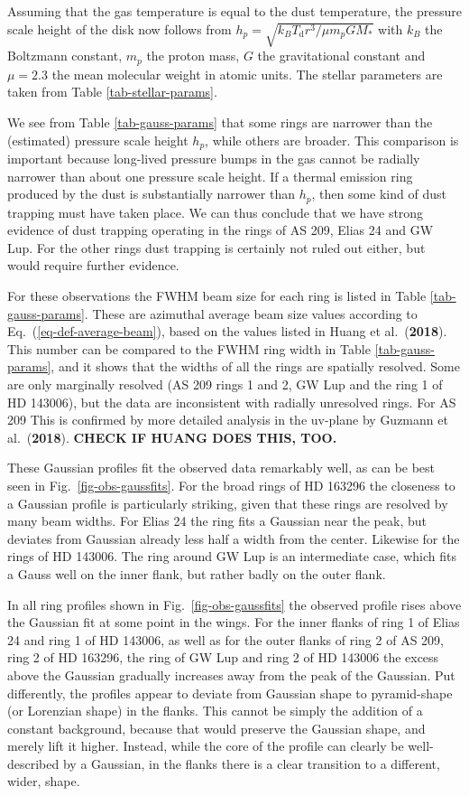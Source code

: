 \documentclass{aa}
\def\paperdsharphuangrings{Huang et al.\ ({\bf 2018})}
\def\paperdsharpguzmann{Guzmann et al.\ ({\bf 2018})}
\begin{document}
Assuming that the gas temperature is equal to the dust temperature, the
pressure scale height of the disk now
follows from $h_p=\sqrt{k_BT_{\mathrm{d}}r^3/\mu m_pGM_{*}}$ with $k_B$ the
Boltzmann constant, $m_p$ the proton mass, $G$ the gravitational constant and
$\mu=2.3$ the mean molecular weight in atomic units. The stellar parameters are
taken from Table \ref{tab-stellar-params}.

We see from Table \ref{tab-gauss-params} that some rings are narrower than the
(estimated) pressure scale height $h_p$, while others are broader. This
comparison is important because long-lived pressure bumps in the gas cannot be
radially narrower than about one pressure scale height. If a thermal emission
ring produced by the dust is substantially narrower than $h_p$, then some kind
of dust trapping must have taken place. We can thus conclude that we have strong
evidence of dust trapping operating in the rings of AS 209, Elias 24 and GW Lup.
For the other rings dust trapping is certainly not ruled out either, but would
require further evidence. 

For these observations the FWHM beam size for each ring is listed in Table
\ref{tab-gauss-params}. These are azimuthal average beam size values according
to Eq.~(\ref{eq-def-average-beam}), based on the values listed in
\paperdsharphuangrings{}. This number can be compared to the FWHM ring width in
Table \ref{tab-gauss-params}, and it shows that the widths of all the rings are
spatially resolved. Some are only marginally resolved (AS 209 rings 1 and 2, GW
Lup and the ring 1 of HD 143006), but the data are inconsistent with radially
unresolved rings. For AS 209 This is confirmed by more detailed analysis in the
uv-plane by \paperdsharpguzmann{}. {\bf CHECK IF HUANG DOES THIS, TOO.}

These Gaussian profiles fit the observed data remarkably well, as can be best
seen in Fig.~\ref{fig-obs-gaussfits}.  For the broad rings of HD 163296 the
closeness to a Gaussian profile is particularly striking, given that these rings
are resolved by many beam widths.  For Elias 24 the ring fits a Gaussian near
the peak, but deviates from Gaussian already less half a width from the
center. Likewise for the rings of HD 143006. The ring around GW Lup is an
intermediate case, which fits a Gauss well on the inner flank, but rather badly
on the outer flank.

In all ring profiles shown in Fig.~\ref{fig-obs-gaussfits} the observed profile
rises above the Gaussian fit at some point in the wings. For the inner flanks of
ring 1 of Elias 24 and ring 1 of HD 143006, as well as for the outer flanks of
ring 2 of AS 209, ring 2 of HD 163296, the ring of GW Lup and ring 2 of HD
143006 the excess above the Gaussian gradually increases away from the peak of
the Gaussian. Put differently, the profiles appear to deviate from Gaussian
shape to pyramid-shape (or Lorenzian shape) in the flanks. This cannot be simply
the addition of a constant background, because that would preserve the Gaussian
shape, and merely lift it higher. Instead, while the core of the profile can clearly
be well-described by a Gaussian, in the flanks there is a clear transition
to a different, wider, shape.
\end{document}
